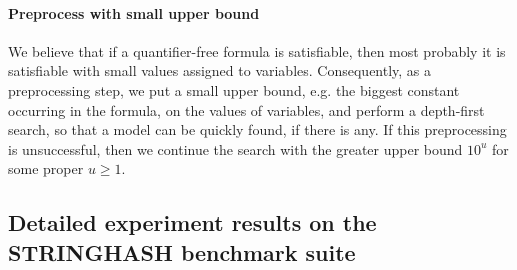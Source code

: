 \paragraph{Preprocess with small upper bound}

We believe that if a quantifier-free {\paexp} formula is satisfiable, then most probably it is satisfiable with small values assigned to variables. Consequently, as a preprocessing step, we put a small upper bound, e.g. the biggest constant occurring in the formula, on the values of variables, and perform a depth-first search, so that a model can be quickly found, if there is any. If this preprocessing is unsuccessful, then we continue the search with the greater upper bound $10^u$ for some proper $u \ge 1$.


\subsection{Detailed experiment results on the STRINGHASH benchmark suite}\label{app-exp}

